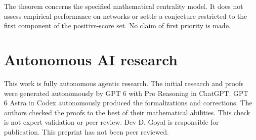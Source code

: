 \documentclass[11pt,a4paper]{article}
\begin{document}
The theorem concerns the specified mathematical centrality model.
It does not assess empirical performance on networks or settle a conjecture
restricted to the first component of the positive-score set.
No claim of first priority is made.

\section*{Autonomous AI research}
This work is fully autonomous agentic research. The initial research and proofs were generated autonomously by GPT 6 with Pro Reasoning in ChatGPT. GPT 6 Astra in Codex autonomously produced the formalizations and corrections. The authors checked the proofs to the best of their mathematical abilities. This check is not expert validation or peer review. Dev D. Goyal is responsible for publication. This preprint has not been peer reviewed.



\end{document}
